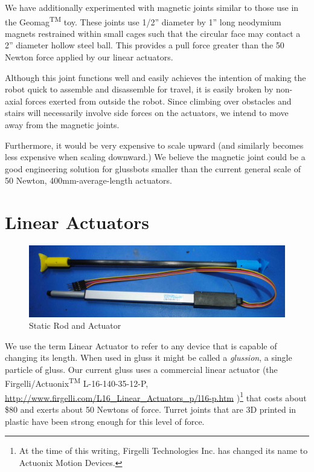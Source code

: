 \documentclass[11pt]{article}
\begin{document}
We have additionally experimented with magnetic joints similar to those use in the Geomag\textsuperscript{TM} toy.
These joints use 1/2'' diameter by 1'' long neodymium magnets restrained within small cages such that the circular face
may contact a 2'' diameter hollow steel ball.  This provides a pull force greater than the 50 Newton force applied by our linear
actuators.

Although this joint functions well and easily achieves the intention of making the robot quick to assemble and
disassemble for travel,
it is easily broken by non-axial forces exerted from outside the robot.
Since climbing over obstacles and stairs will necessarily involve side forces on the actuators,
we intend to move away from the magnetic joints.

Furthermore, it would be very expensive to scale upward (and similarly becomes less expensive when
scaling downward.) We believe the magnetic joint could be a good engineering solution for glussbots smaller than the current
general scale of 50 Newton, 400mm-average-length actuators.


\section{Linear Actuators}
\label{linearactuators}

\begin{figure}[!ht]
  \centering
    \includegraphics[width=1.0\textwidth]{figureslowres/CarbonFiberAndActuator.jpg}
    \caption[Static Rod and Actuator]{Static Rod and Actuator}
      \label{rodAndActuator}
\end{figure}

We use the term Linear Actuator to refer to any device that is capable of changing its length. When
used in gluss it might be called a \emph{glussion}, a single particle of gluss. Our current gluss
uses a commercial linear actuator (the Firgelli/Actuonix\textsuperscript{TM} L-16-140-35-12-P,
\url{http://www.firgelli.com/L16_Linear_Actuators_p/l16-p.htm}
)\footnote{At the time of this writing, Firgelli Technologies Inc. has changed its name to Actuonix Motion Devices.}
that costs about \$80 and exerts about 50 Newtons of force.
Turret joints that are 3D printed in plastic have been strong enough for this level of force.
\end{document}

